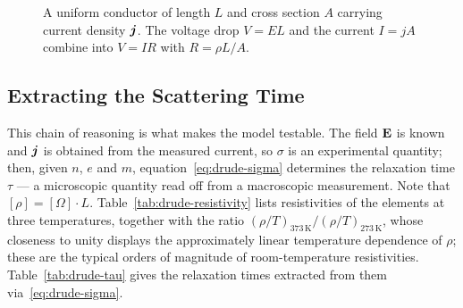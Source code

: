 \begin{figure}[ht]
    \centering
    \caption{A uniform conductor of length $L$ and cross section $A$ carrying current density $\bm{j}$. The voltage drop $V=EL$ and the current $I=jA$ combine into $V = IR$ with $R = \rho L/A$.}
    \label{fig:drude-wire}
\end{figure}

\subsection{Extracting the Scattering Time}

This chain of reasoning is what makes the model testable. The field $\cvect{E}$ is known and $\bm{j}$ is obtained from the measured current, so $\sigma$ is an experimental quantity; then, given $n$, $e$ and $m$, equation~\eqref{eq:drude-sigma} determines the relaxation time $\tau$ --- a microscopic quantity read off from a macroscopic measurement. Note that $[\rho] = [\Omega]\cdot L$. Table~\ref{tab:drude-resistivity} lists resistivities of the elements at three temperatures, together with the ratio $(\rho/T)_{373\,\mathrm{K}}/(\rho/T)_{273\,\mathrm{K}}$, whose closeness to unity displays the approximately linear temperature dependence of $\rho$; these are the typical orders of magnitude of room-temperature resistivities. Table~\ref{tab:drude-tau} gives the relaxation times extracted from them via~\eqref{eq:drude-sigma}.

